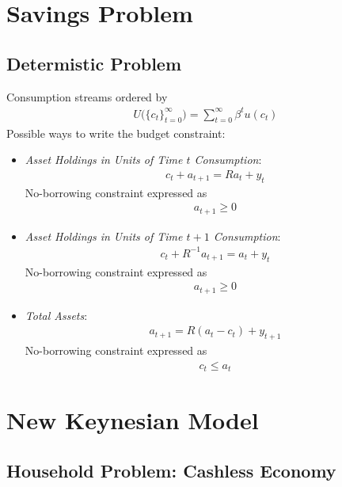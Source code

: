 \documentclass[12pt]{article}
\theoremstyle{plain}
\theoremstyle{definition}
\theoremstyle{remark}
\newcommand{\sumtinfz}{\sum^\infty_{t=0}}
\newcommand{\tinfz}{^\infty_{t=0}}
\begin{document}
\clearpage
\section{Savings Problem}

\subsection{Determistic Problem}

Consumption streams ordered by
\begin{align*}
  U\big(\{c_t\}\tinfz\big)
  = \sumtinfz \beta^tu(c_t)
\end{align*}
Possible ways to write the budget constraint:
\begin{itemize}
  \item
    \emph{Asset Holdings in Units of Time $t$ Consumption}:
    \begin{align*}
      c_t + a_{t+1} = Ra_t + y_t
    \end{align*}
    No-borrowing constraint expressed as
    \begin{align*}
      a_{t+1} \geq 0
    \end{align*}

  \item
    \emph{Asset Holdings in Units of Time $t+1$ Consumption}:
    \begin{align*}
      c_t + R^{-1}a_{t+1} = a_t + y_t
    \end{align*}
    No-borrowing constraint expressed as
    \begin{align*}
      a_{t+1} \geq 0
    \end{align*}

  \item \emph{Total Assets}:
    \begin{align*}
      a_{t+1} = R(a_t-c_t) + y_{t+1}
    \end{align*}
    No-borrowing constraint expressed as
    \begin{align*}
      c_t \leq a_t
    \end{align*}


\end{itemize}


\clearpage
\section{New Keynesian Model}

\subsection{Household Problem: Cashless Economy}
\end{document}
